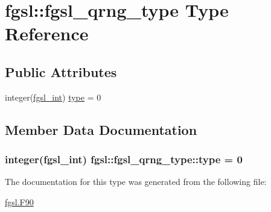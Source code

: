 \hypertarget{structfgsl_1_1fgsl__qrng__type}{}\section{fgsl\+:\+:fgsl\+\_\+qrng\+\_\+type Type Reference}
\label{structfgsl_1_1fgsl__qrng__type}
\subsection*{Public Attributes}
\begin{DoxyCompactItemize}
\item 
integer(\hyperlink{namespacefgsl_a222deda1d7a0c0e845ce4a683318efeb}{fgsl\+\_\+int}) \hyperlink{structfgsl_1_1fgsl__qrng__type_a3e0ae09be0c95e66fe6bef740c4d2688}{type} = 0
\end{DoxyCompactItemize}


\subsection{Member Data Documentation}
\hypertarget{structfgsl_1_1fgsl__qrng__type_a3e0ae09be0c95e66fe6bef740c4d2688}{}
\subsubsection[{type}]{\setlength{\rightskip}{0pt plus 5cm}integer({\bf fgsl\+\_\+int}) fgsl\+::fgsl\+\_\+qrng\+\_\+type\+::type = 0}\label{structfgsl_1_1fgsl__qrng__type_a3e0ae09be0c95e66fe6bef740c4d2688}


The documentation for this type was generated from the following file\+:\begin{DoxyCompactItemize}
\item 
\hyperlink{fgsl_8F90}{fgsl.\+F90}\end{DoxyCompactItemize}
